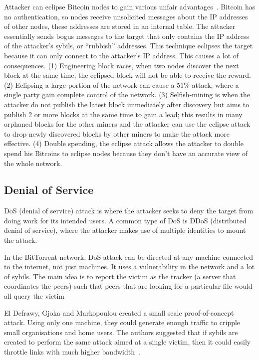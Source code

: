 Attacker can eclipse Bitcoin nodes to gain various unfair
advantages~\cite{heilman2015eclipse}. Bitcoin has no authentication, so nodes
receive unsolicited messages about the IP addresses of other nodes, these
addresses are stored in an internal table. The attacker essentially sends bogus
messages to the target that only contains the IP address of the attacker's
sybils, or ``rubbish'' addresses. This technique eclipses the target because it
can only connect to the attacker's IP address. This causes a lot of
consequences. (1) Engineering block races, when two nodes discover the next
block at the same time, the eclipsed block will not be able to receive the
reward. (2) Eclipsing a large portion of the network can cause a 51\% attack,
where a single party gain complete control of the network. (3) Selfish-mining is
when the attacker do not publish the latest block immediately after discovery
but aims to publish 2 or more blocks at the same time to gain a lead; this
results in many orphaned blocks for the other miners and the attacker can use
the eclipse attack to drop newly discovered blocks by other miners to make the
attack more effective. (4) Double spending, the eclipse attack allows the
attacker to double spend his Bitcoins to eclipse nodes because they don't have
an accurate view of the whole network.

\subsection{Denial of Service}
DoS (denial of service) attack is where the attacker seeks to deny the target
from doing work for its intended users. A common type of DoS is DDoS
(distributed denial of service), where the attacker makes use of multiple
identities to mount the attack.

In the BitTorrent network, DoS attack can be directed at any machine connected
to the internet, not just machines. It uses a vulnerability in the network and a
lot of sybils. The main idea is to report the victim as the tracker (a server
that coordinates the peers) such that peers that are looking for a particular
file would all query the victim~\cite{sia2006ddos}

El Defrawy, Gjoka and Markopoulou created a small scale proof-of-concept attack.
Using only one machine, they could generate enough traffic to cripple small
organisations and home users. The authors suggested that if sybils are created
to perform the same attack aimed at a single victim, then it could easily
throttle links with much higher bandwidth~\cite{el2007bottorrent}.

